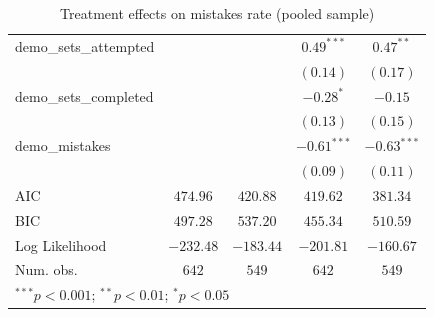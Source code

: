 \documentclass[
  12,
  letterpaper,
  DIV=11,
  numbers=noendperiod]{scrartcl}
\begin{document}
\begin{table}
{\begin{center}
\begin{tabular}{l c c c c}
demo\_sets\_attempted           &               &               & $0.49^{***}$  & $0.47^{**}$   \\
                                &               &               & $(0.14)$      & $(0.17)$      \\
demo\_sets\_completed           &               &               & $-0.28^{*}$   & $-0.15$       \\
                                &               &               & $(0.13)$      & $(0.15)$      \\
demo\_mistakes                  &               &               & $-0.61^{***}$ & $-0.63^{***}$ \\
                                &               &               & $(0.09)$      & $(0.11)$      \\
\hline
AIC                             & $474.96$      & $420.88$      & $419.62$      & $381.34$      \\
BIC                             & $497.28$      & $537.20$      & $455.34$      & $510.59$      \\
Log Likelihood                  & $-232.48$     & $-183.44$     & $-201.81$     & $-160.67$     \\
Num. obs.                       & $642$         & $549$         & $642$         & $549$         \\
\hline
\multicolumn{5}{l}{\scriptsize{$^{***}p<0.001$; $^{**}p<0.01$; $^{*}p<0.05$}}
\end{tabular}
\label{table:coefficients}
\end{center}

}

\caption{\label{tbl-reg-mistakes-full}Treatment effects on mistakes rate
(pooled sample)}

\end{table}%
\end{document}
